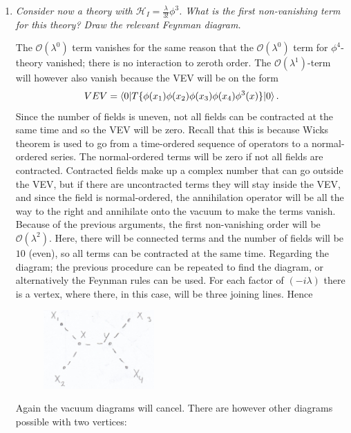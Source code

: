 \begin{example}
\begin{enumerate}
		\item \emph{Consider now a theory with $\mathcal{H}_I=\frac{\lambda}{3!}\phi^3$. What is the first non-vanishing term for this theory? Draw the relevant Feynman diagram.}
		
		The $\mathcal{O}(\lambda^0)$ term vanishes for the same reason that the $\mathcal{O}(\lambda^0)$ term for $\phi^4$-theory vanished; there is no interaction to zeroth order. The $\mathcal{O}(\lambda^1)$-term will however also vanish because the VEV will be on the form
		\begin{equation}
			VEV=\braket{0|T\{\phi(x_1)\phi(x_2)\phi(x_3)\phi(x_4)\phi^3(x)\}|0}.
		\end{equation} 
		Since the number of fields is uneven, not all fields can be contracted at the same time and so the VEV will be zero. Recall that this is because Wicks theorem is used to go from a time-ordered sequence of operators to a normal-ordered series. The normal-ordered terms will be zero if not all fields are contracted. Contracted fields make up a complex number that can go outside the VEV, but if there are uncontracted terms they will stay inside the VEV, and since the field is normal-ordered, the annihilation operator will be all the way to the right and annihilate onto the vacuum to make the terms vanish. Because of the previous arguments, the first non-vanishing order will be $\mathcal{O}(\lambda^2)$. Here, there will be connected terms and the number of fields will be $10$ (even), so all terms can be contracted at the same time. 
		Regarding the diagram; the previous procedure can be repeated to find the diagram, or alternatively the Feynman rules can be used. For each factor of $(-i\lambda)$ there is a vertex, where there, in this case, will be three joining lines. Hence
		\begin{figure}[H]
			\captionsetup{width=1\textwidth}
			\centering
			\includegraphics[width=0.4\textwidth]{figures/scal2}
		\end{figure}
		Again the vacuum diagrams will cancel. There are however other diagrams possible with two vertices:
		\begin{figure}[H]
			\captionsetup{width=1\textwidth}

\end{figure}
\end{enumerate}
\end{example}
